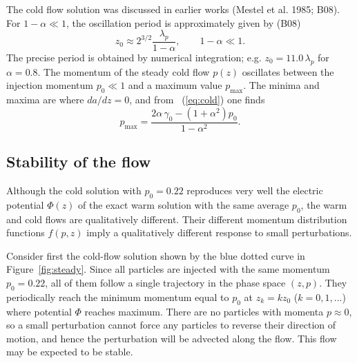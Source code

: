 The cold flow solution was discussed in earlier works
   (Mestel et al. 1985; B08).
For $1-\alpha\ll 1$, the oscillation period is approximately given by (B08)
\begin{equation}
    z_0 \approx 2^{3/2}\frac{\lambda_p}{1-\alpha}, \qquad 1-\alpha\ll 1.
\end{equation}
The precise period is obtained by numerical integration; e.g.
$z_0=11.0\,\lambda_p$ for $\alpha=0.8$.
The momentum of the steady cold flow $p(z)$ oscillates between the injection
momentum $p_0\ll 1$ and a maximum value $p_{\max}$. The minima and
maxima are where $da/dz=0$, and from \Eq~(\ref{eq:cold}) one finds
\begin{equation}
\label{eq:pmax}
    p_{\max}=\frac{2\alpha\,\gamma_0-(1+\alpha^2)p_0}{1-\alpha^2}.
\end{equation}


\subsection{Stability of the flow}


Although the cold solution with $p_0=0.22$ reproduces very well the electric
potential $\Phi(z)$ of the exact warm solution with the same average $p_0$,
the warm and cold flows are qualitatively different. Their different
momentum distribution functions $f(p,z)$ imply a qualitatively different response
to small perturbations.

Consider first the cold-flow solution
shown by the blue dotted curve in Figure~\ref{fig:steady}.
Since all particles are injected with the same momentum $p_0=0.22$,
all of them follow a single trajectory in the phase space $(z,p)$.
They periodically reach the minimum momentum equal to $p_0$ at
$z_k=kz_0$ ($k=0,1,...$) where potential $\Phi$ reaches maximum.
There are no particles with momenta $p\approx 0$, so
a small perturbation cannot force any particles to reverse their direction of motion,
and hence the perturbation will be advected along the flow.
This flow may be expected to be stable.

